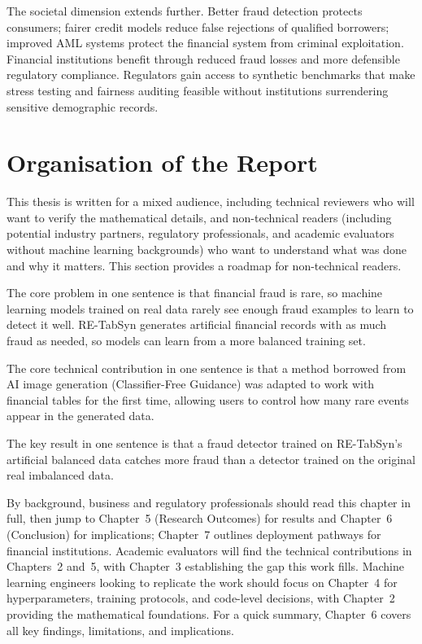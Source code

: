 The societal dimension extends further. Better fraud detection protects consumers; fairer credit models reduce false rejections of qualified borrowers; improved AML systems protect the financial system from criminal exploitation. Financial institutions benefit through reduced fraud losses and more defensible regulatory compliance. Regulators gain access to synthetic benchmarks that make stress testing and fairness auditing feasible without institutions surrendering sensitive demographic records.

\section{Organisation of the Report}

This thesis is written for a mixed audience, including technical reviewers who will want to verify the mathematical details, and non-technical readers (including potential industry partners, regulatory professionals, and academic evaluators without machine learning backgrounds) who want to understand what was done and why it matters. This section provides a roadmap for non-technical readers.

The core problem in one sentence is that financial fraud is rare, so machine learning models trained on real data rarely see enough fraud examples to learn to detect it well. RE-TabSyn generates artificial financial records with as much fraud as needed, so models can learn from a more balanced training set.

The core technical contribution in one sentence is that a method borrowed from AI image generation (Classifier-Free Guidance) was adapted to work with financial tables for the first time, allowing users to control how many rare events appear in the generated data.

The key result in one sentence is that a fraud detector trained on RE-TabSyn's artificial balanced data catches more fraud than a detector trained on the original real imbalanced data.

By background, business and regulatory professionals should read this chapter in full, then jump to Chapter~5 (Research Outcomes) for results and Chapter~6 (Conclusion) for implications; Chapter~7 outlines deployment pathways for financial institutions. Academic evaluators will find the technical contributions in Chapters~2 and~5, with Chapter~3 establishing the gap this work fills. Machine learning engineers looking to replicate the work should focus on Chapter~4 for hyperparameters, training protocols, and code-level decisions, with Chapter~2 providing the mathematical foundations. For a quick summary, Chapter~6 covers all key findings, limitations, and implications.

